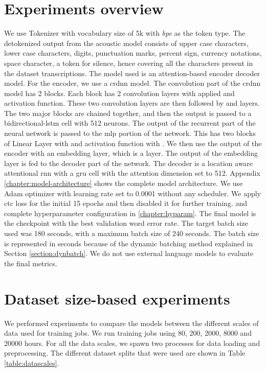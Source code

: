 \section{Experiments overview}
\label{section:exp_desc}
We use  Tokenizer with vocabulary size of 5k with \emph{bpe} as the token type. The detokenized output from the acoustic model consists of upper case characters, lower case characters, digits, punctuation marks, percent sign, currency notations, space character, a token for silence, hence covering all the characters present in the dataset transcriptions. The model used is an attention-based encoder decoder model. For the encoder, we use a \acrshort{crdnn} model. The convolution part of the \acrshort{crdnn} model has 2  blocks. Each block has 2 convolution layers with  applied and  activation function. These two convolution layers are then followed by  and  layers. The two major blocks are chained together, and then the output is passed to a bidirectional-\acrshort{lstm} cell with 512 neurons. The output of the recurrent part of the neural network is passed to the \acrshort{mlp} portion of the network. This has two blocks of Linear Layer with  and  activation function with . We then use the output of the encoder with an embedding layer, which is a  layer. The output of the embedding layer is fed to the decoder part of the network. The decoder is a location aware attentional \acrshort{rnn} with a \acrshort{gru} cell with the attention dimension set to 512. Appendix \ref{chapter:model-architecture} shows the complete model architecture. We use Adam optimizer with learning rate set to 0.0001 without any scheduler. We apply \acrshort{ctc} loss for the initial 15 epochs and then disabled it for further training. and complete hyperparameter configuration in \ref{chapter:hyparam}. The final model is the checkpoint with the best validation word error rate. The target batch size used was 180 seconds, with a maximum batch size of 240 seconds. The batch size is represented in seconds because of the dynamic batching method explained in Section \ref{section:dynbatch}. We do not use external language models to evaluate the final metrics.  

\section{Dataset size-based experiments}
\label{section:res_scale}
We performed experiments to compare the models between the different scales of data used for training jobs. We run training jobs using 80, 200, 2000, 8000 and 20000 hours. For all the data scales, we spawn two processes for data loading and preprocessing. The different dataset splits that were used are shown in Table \ref{table:datascales}.

